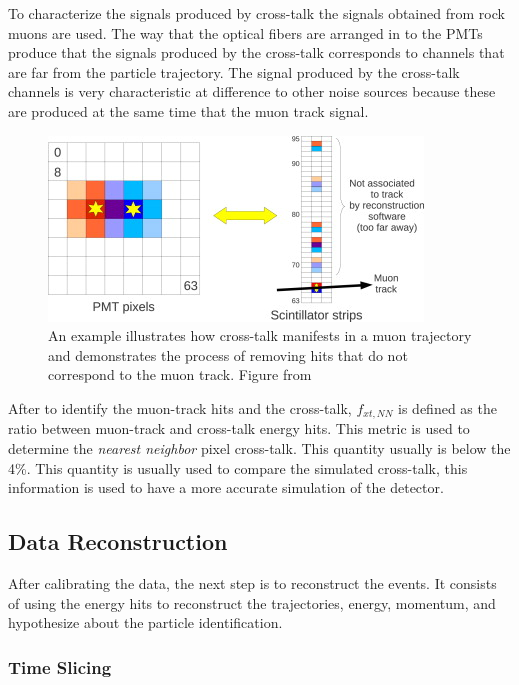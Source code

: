 \begin{itemize}
    To characterize the  signals produced by cross-talk the signals obtained from rock muons are used. The way that the optical fibers are arranged in to the PMTs produce that the signals produced by the cross-talk corresponds to channels that are far from the particle trajectory. The signal produced by the cross-talk channels is very characteristic at difference to other noise sources because these are produced at the same time that the muon track signal.

    \begin{figure}[!htb]
        \centering
        \includegraphics{Figures/Chapter2/CrossTallkExample.jpg}
        \caption{An example illustrates how cross-talk manifests in a muon trajectory and demonstrates the process of removing hits that do not correspond to the muon track. Figure from \cite{MINERvA}}
        \label{fig:Chapter2:CrossTallkExample}
    \end{figure}
    After to identify the muon-track hits and the cross-talk, $f_{xt,NN}$ is defined as the ratio between muon-track and cross-talk energy hits. This metric is used to determine the \textit{nearest neighbor} pixel cross-talk. This quantity usually is below the 4\%. This quantity is usually used to compare the simulated cross-talk, this information is used to have a more accurate simulation of the detector.  
    
\end{itemize}

\pagebreak


\subsection{Data Reconstruction}
\label{Cap:MnvExp:MnvDetector:DataReconstruction}

After calibrating the data, the next step is to reconstruct the events. It consists of using the energy hits to reconstruct the trajectories, energy, momentum, and hypothesize about the particle identification. 

\subsubsection{Time Slicing}
\label{Cap:MnvExp:MnvDetector:DataReconstruction:TimeSlicing}

